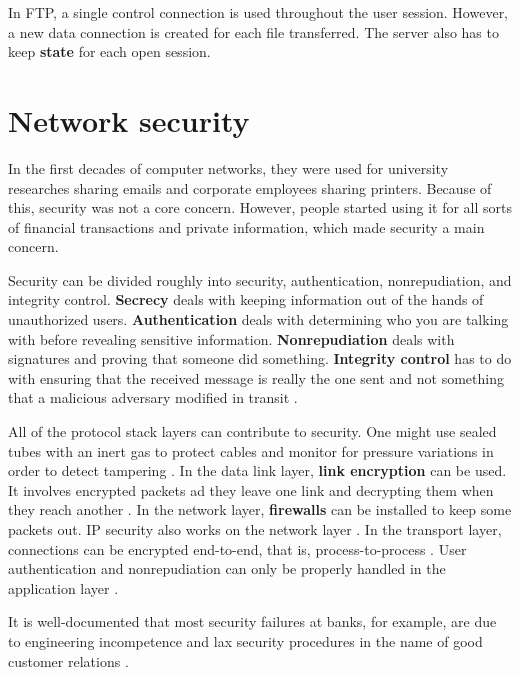 In FTP, a single control connection is used throughout the user session. However, a new data connection is created for each file transferred. The server also has to keep \textbf{state} for each open session.

\section{Network security}

In the first decades of computer networks, they were used for university researches sharing emails and corporate employees sharing printers. Because of this, security was not a core concern. However, people started using it for all sorts of financial transactions and private information, which made security a main concern.

Security can be divided roughly into security, authentication, nonrepudiation, and integrity control. \textbf{Secrecy} deals with keeping information out of the hands of unauthorized users. \textbf{Authentication} deals with determining who you are talking with before revealing sensitive information. \textbf{Nonrepudiation} deals with signatures and proving that someone did something. \textbf{Integrity control} has to do with ensuring that the received message is really the one sent and not something that a malicious adversary modified in transit \cite[p.~764]{computer-networks-tanenbaum-2012}.

All of the protocol stack layers can contribute to security. One might use sealed tubes with an inert gas to protect cables and monitor for pressure variations in order to detect tampering \cite[p.~765]{computer-networks-tanenbaum-2012}. In the data link layer, \textbf{link encryption} can be used. It involves encrypted packets ad they leave one link and decrypting them when they reach another \cite[p.~765]{computer-networks-tanenbaum-2012}.
In the network layer, \textbf{firewalls} can be installed to keep some packets out. IP security also works on the network layer \cite[p.~765]{computer-networks-tanenbaum-2012}.
In the transport layer, connections can be encrypted end-to-end, that is, process-to-process \cite[p.~765]{computer-networks-tanenbaum-2012}.
User authentication and nonrepudiation can only be properly handled in the application layer \cite[p.~765]{computer-networks-tanenbaum-2012}.

It is well-documented that most security failures at banks, for example, are due to engineering incompetence and lax security procedures in the name of good customer relations \cite[p.~765]{computer-networks-tanenbaum-2012}.

